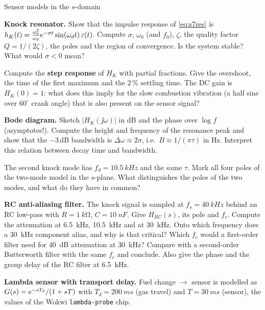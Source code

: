 \begin{exercise}{Sensor models in the $s$-domain}{\Paper}
\begin{tasks}
  \item \textbf{Knock resonator.} Show that the impulse response of
    \eqref{eq:s7res} is $h_K(t)=\frac{\omega_0^2}{\omega_d}\mathrm{e}^{-\sigma t}
    \sin(\omega_d t)\,\varepsilon(t)$. Compute $\sigma$, $\omega_0$ (and
    $f_0$), $\zeta$, the quality factor $Q=1/(2\zeta)$, the poles and the
    region of convergence. Is the system stable? What would $\sigma<0$ mean?
  \item Compute the \textbf{step response} of $H_K$ with partial fractions.
    Give the overshoot, the time of the first maximum and the 2\,\% settling
    time. The DC gain is $H_K(0)=1$: what does this imply for the slow
    combustion vibration (a half sine over $60^\circ$ crank angle) that is also
    present on the sensor signal?
  \item \textbf{Bode diagram.} Sketch $|H_K(\jj\omega)|$ in dB and the phase
    over $\log f$ (asymptotes!). Compute the height and frequency of the
    resonance peak and show that the $-3$\,dB bandwidth is
    $\Delta\omega\approx2\sigma$, i.e.\ $B\approx 1/(\pi\tau)$ in Hz. Interpret
    this relation between decay time and bandwidth.
  \item The second knock mode has $f_d=\SI{10.5}{kHz}$ and the same $\tau$.
    Mark all four poles of the two-mode model in the $s$-plane. What
    distinguishes the poles of the two modes, and what do they have in common?
  \item \textbf{RC anti-aliasing filter.} The knock signal is sampled at
    $f_s=\SI{40}{kHz}$ behind an RC low-pass with $R=\SI{1}{k\ohm}$,
    $C=\SI{10}{nF}$. Give $H_{RC}(s)$, its pole and $f_c$. Compute the
    attenuation at \SI{6.5}{kHz}, \SI{10.5}{kHz} and at \SI{30}{kHz}. Onto which
    frequency does a \SI{30}{kHz} component alias, and why is that critical?
    Which $f_c$ would a first-order filter need for \SI{40}{dB} attenuation at
    \SI{30}{kHz}? Compare with a second-order Butterworth filter with the same
    $f_c$ and conclude. Also give the phase and the group delay of the RC
    filter at \SI{6.5}{kHz}.
  \item \textbf{Lambda sensor with transport delay.} Fuel change
    $\rightarrow$ sensor is modelled as $G(s)=\mathrm{e}^{-sT_d}/(1+sT)$ with
    $T_d=\SI{200}{ms}$ (gas travel) and $T=\SI{30}{ms}$ (sensor), the values of
    the Wokwi \texttt{lambda-probe} chip.

\end{tasks}
\end{exercise}
